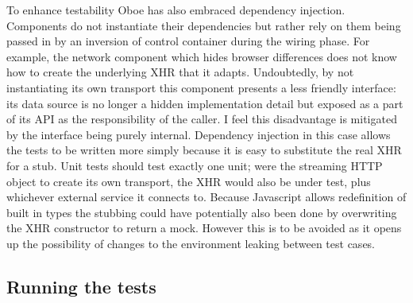 \documentclass[12pt, ]{article}
\begin{document}
To enhance testability Oboe has also embraced dependency injection.
Components do not instantiate their dependencies but rather rely on them
being passed in by an inversion of control container during the wiring
phase. For example, the network component which hides browser
differences does not know how to create the underlying XHR that it
adapts. Undoubtedly, by not instantiating its own transport this
component presents a less friendly interface: its data source is no
longer a hidden implementation detail but exposed as a part of its API
as the responsibility of the caller. I feel this disadvantage is
mitigated by the interface being purely internal. Dependency injection
in this case allows the tests to be written more simply because it is
easy to substitute the real XHR for a stub. Unit tests should test
exactly one unit; were the streaming HTTP object to create its own
transport, the XHR would also be under test, plus whichever external
service it connects to. Because Javascript allows redefinition of built
in types the stubbing could have potentially also been done by
overwriting the XHR constructor to return a mock. However this is to be
avoided as it opens up the possibility of changes to the environment
leaking between test cases.

\subsection{Running the tests}\label{running-the-tests}
\end{document}
